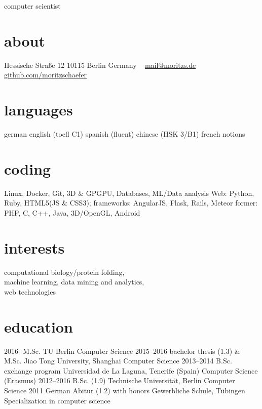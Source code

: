 \documentclass[]{friggeri-cv}
\begin{document}
       {computer scientist}


\begin{aside}
  \section{about}
    Hessische Straße 12
    10115 Berlin
    Germany
    ~
    \href{mailto:mail@moritz.de}{mail@moritzs.de}
    \href{https://github.com/moritzschaefer}{github.com/moritzschaefer}
  \section{languages}
    german
    english (toefl C1)
    spanish (fluent)
    chinese (HSK 3/B1)
    french notions
  \section{coding}
    Linux, Docker, Git, 3D \& GPGPU, Databases, ML/Data analysis
    Web:
    Python, Ruby,
    HTML5(JS \& CSS3); frameworks: AngularJS, Flask, Rails, Meteor
    former:
    PHP, C, C++, Java, 3D/OpenGL, Android
\end{aside}

\section{interests}

computational biology/protein folding, \\
machine learning, data mining and analytics, \\
web technologies%

\section{education}

\begin{entrylist}
  \entry
    {2016-}
    {M.Sc.}
    {TU Berlin}
    {Computer Science}
  \entry
    {2015–2016}
    {bachelor thesis (1.3) \& M.Sc.}
    {Jiao Tong University, Shanghai}
    {Computer Science}
  \entry
    {2013–2014}
    {B.Sc. exchange program}
    {Universidad de La Laguna, Tenerife (Spain)}
    {Computer Science (Erasmus)}
  \entry
    {2012–2016}
    {B.Sc. (1.9)}
    {Technische Universität, Berlin}
    {Computer Science}
  \entry
    {2011}
    {German Abitur (1.2) with honors}
    {Gewerbliche Schule, Tübingen}
    {Specialization in computer science}
\end{entrylist}
\end{document}

